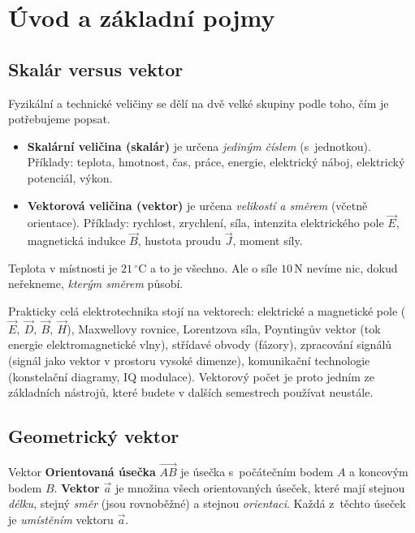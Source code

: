 \documentclass[a4paper,11pt]{article}
\newcommand{\jed}[1]{\,\mathrm{#1}}      %
\begin{document}
\section{Úvod a základní pojmy}

\subsection{Skalár versus vektor}

Fyzikální a technické veličiny se dělí na dvě velké skupiny podle toho, čím je
potřebujeme popsat.

\begin{itemize}
  \item \textbf{Skalární veličina (skalár)} je určena \emph{jediným číslem} (s~jednotkou).
        Příklady: teplota, hmotnost, čas, práce, energie, elektrický náboj, elektrický
        potenciál, výkon.
  \item \textbf{Vektorová veličina (vektor)} je určena \emph{velikostí a směrem} (včetně
        orientace). Příklady: rychlost, zrychlení, síla, intenzita elektrického pole
        $\vec E$, magnetická indukce $\vec B$, hustota proudu $\vec J$, moment síly.
\end{itemize}

Teplota v místnosti je $21\,^\circ\mathrm{C}$ a to je všechno. Ale o síle
$10\jed{N}$ nevíme nic, dokud neřekneme, \emph{kterým směrem} působí.

\begin{ekt}
Prakticky celá elektrotechnika stojí na vektorech: elektrické a magnetické pole
($\vec E,\ \vec D,\ \vec B,\ \vec H$), Maxwellovy rovnice, Lorentzova síla,
Poyntingův vektor (tok energie elektromagnetické vlny), střídavé obvody
(fázory), zpracování signálů (signál jako vektor v prostoru vysoké dimenze),
komunikační technologie (konstelační diagramy, IQ modulace). Vektorový počet je
proto jedním ze základních nástrojů, které budete v dalších semestrech
používat neustále.
\end{ekt}

\subsection{Geometrický vektor}

\begin{definice}{Vektor}
\textbf{Orientovaná úsečka} $\overrightarrow{AB}$ je úsečka s~počátečním bodem $A$
a koncovým bodem $B$. \textbf{Vektor} $\vec a$ je množina všech orientovaných úseček,
které mají stejnou \emph{délku}, stejný \emph{směr} (jsou rovnoběžné) a stejnou
\emph{orientaci}. Každá z~těchto úseček je \emph{umístěním} vektoru $\vec a$.
\end{definice}
\end{document}
